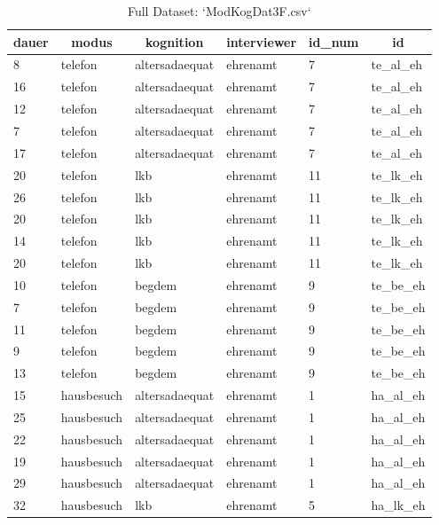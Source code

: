 \documentclass[
  doc,floatsintext]{apa6}
\begin{document}
\begin{table}[tbp]

\begin{center}
\begin{threeparttable}

\caption{\label{tab:tabinspect3}Full Dataset: `ModKogDat3F.csv`}

\begin{tabular}{llllll}
\toprule
dauer & \multicolumn{1}{c}{modus} & \multicolumn{1}{c}{kognition} & \multicolumn{1}{c}{interviewer} & \multicolumn{1}{c}{id\_num} & \multicolumn{1}{c}{id}\\
\midrule
8 & telefon & altersadaequat & ehrenamt & 7 & te\_al\_eh\\
16 & telefon & altersadaequat & ehrenamt & 7 & te\_al\_eh\\
12 & telefon & altersadaequat & ehrenamt & 7 & te\_al\_eh\\
7 & telefon & altersadaequat & ehrenamt & 7 & te\_al\_eh\\
17 & telefon & altersadaequat & ehrenamt & 7 & te\_al\_eh\\
20 & telefon & lkb & ehrenamt & 11 & te\_lk\_eh\\
26 & telefon & lkb & ehrenamt & 11 & te\_lk\_eh\\
20 & telefon & lkb & ehrenamt & 11 & te\_lk\_eh\\
14 & telefon & lkb & ehrenamt & 11 & te\_lk\_eh\\
20 & telefon & lkb & ehrenamt & 11 & te\_lk\_eh\\
10 & telefon & begdem & ehrenamt & 9 & te\_be\_eh\\
7 & telefon & begdem & ehrenamt & 9 & te\_be\_eh\\
11 & telefon & begdem & ehrenamt & 9 & te\_be\_eh\\
9 & telefon & begdem & ehrenamt & 9 & te\_be\_eh\\
13 & telefon & begdem & ehrenamt & 9 & te\_be\_eh\\
15 & hausbesuch & altersadaequat & ehrenamt & 1 & ha\_al\_eh\\
25 & hausbesuch & altersadaequat & ehrenamt & 1 & ha\_al\_eh\\
22 & hausbesuch & altersadaequat & ehrenamt & 1 & ha\_al\_eh\\
19 & hausbesuch & altersadaequat & ehrenamt & 1 & ha\_al\_eh\\
29 & hausbesuch & altersadaequat & ehrenamt & 1 & ha\_al\_eh\\
32 & hausbesuch & lkb & ehrenamt & 5 & ha\_lk\_eh\\

\end{tabular}
\end{threeparttable}
\end{center}
\end{table}
\end{document}
